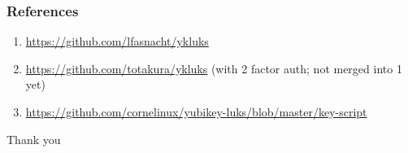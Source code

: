 \documentclass{beamer}
\begin{document}
\begin{frame}
  \frametitle{References}
  \begin{enumerate}
  \item \url{https://github.com/lfasnacht/ykluks}
  \item \url{https://github.com/totakura/ykluks} (with 2 factor auth; not merged
    into 1 yet)
  \item \url{https://github.com/cornelinux/yubikey-luks/blob/master/key-script}
  \end{enumerate}
\end{frame}

\begin{frame}
  \begin{center}
    Thank you
  \end{center}
\end{frame}
\end{document}

